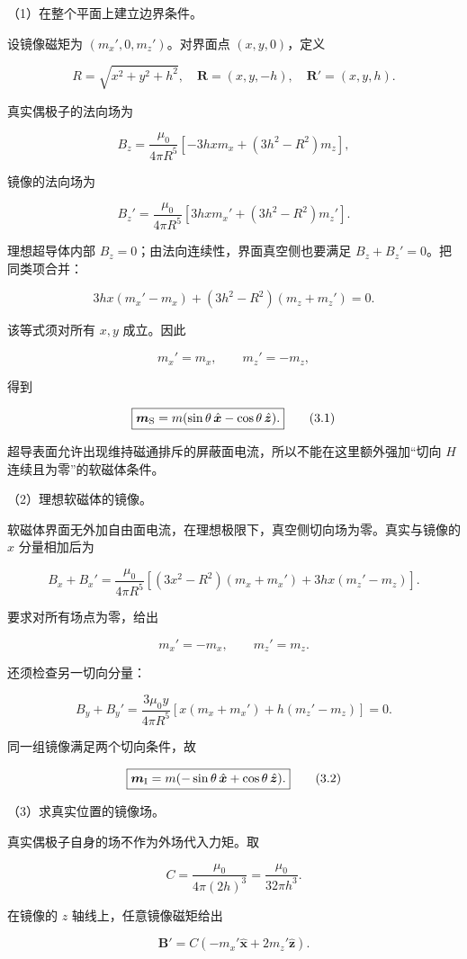 \documentclass[12pt,a4paper,fontset=fandol]{ctexart}
\begin{document}
（1）在整个平面上建立边界条件。

设镜像磁矩为 \((m_x',0,m_z')\)。对界面点 \((x,y,0)\)，定义

\[
R=\sqrt{x^2+y^2+h^2},\quad
\boldsymbol R=(x,y,-h),\quad
\boldsymbol R'=(x,y,h).
\]

真实偶极子的法向场为

\[
B_z=\frac{\mu_0}{4\pi R^5}
\left[-3hx m_x+(3h^2-R^2)m_z\right],
\]

镜像的法向场为

\[
B_z'=\frac{\mu_0}{4\pi R^5}
\left[3hx m_x'+(3h^2-R^2)m_z'\right].
\]

理想超导体内部 \(B_z=0\)；由法向连续性，界面真空侧也要满足
\(B_z+B_z'=0\)。把同类项合并：

\[
3hx(m_x'-m_x)+(3h^2-R^2)(m_z+m_z')=0.
\]

该等式须对所有 \(x,y\) 成立。因此

\[
m_x'=m_x,\qquad m_z'=-m_z,
\]

得到

\[
\boxed{\boldsymbol m_{\rm S}
=m(\sin\theta\,\hat{\boldsymbol x}-\cos\theta\,\hat{\boldsymbol z}).}
\tag{3.1}
\]

超导表面允许出现维持磁通排斥的屏蔽面电流，所以不能在这里额外强加``切向
\(H\) 连续且为零''的软磁体条件。

（2）理想软磁体的镜像。

软磁体界面无外加自由面电流，在理想极限下，真空侧切向场为零。真实与镜像的
\(x\) 分量相加后为

\[
B_x+B_x'=\frac{\mu_0}{4\pi R^5}
\left[(3x^2-R^2)(m_x+m_x')+3hx(m_z'-m_z)\right].
\]

要求对所有场点为零，给出

\[
m_x'=-m_x,\qquad m_z'=m_z.
\]

还须检查另一切向分量：

\[
B_y+B_y'=\frac{3\mu_0y}{4\pi R^5}
\left[x(m_x+m_x')+h(m_z'-m_z)\right]=0.
\]

同一组镜像满足两个切向条件，故

\[
\boxed{\boldsymbol m_{\rm I}
=m(-\sin\theta\,\hat{\boldsymbol x}+\cos\theta\,\hat{\boldsymbol z}).}
\tag{3.2}
\]

（3）求真实位置的镜像场。

真实偶极子自身的场不作为外场代入力矩。取

\[
C=\frac{\mu_0}{4\pi(2h)^3}=\frac{\mu_0}{32\pi h^3}.
\]

在镜像的 \(z\) 轴线上，任意镜像磁矩给出

\[
\boldsymbol B'=C(-m_x'\hat{\boldsymbol x}+2m_z'\hat{\boldsymbol z}).
\]
\end{document}
